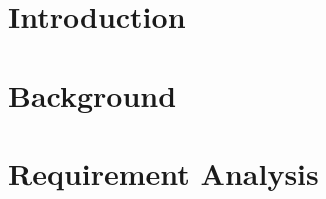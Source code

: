 \documentclass{l4proj}
\begin{document}
\tableofcontents

%
%
%
%
%
%
%
%
\chapter{Introduction}





\chapter{Background}

\chapter{Requirement Analysis}

\end{document}
